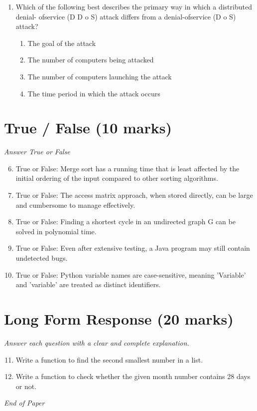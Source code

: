 \documentclass[12pt]{article}
\begin{document}
\begin{enumerate}[label=\arabic*.]
\begin{enumerate}[label=(\alph*)]
    \item To translate Web addresses to host names
    \item To determine the IP address of a given host name
    \item To determine the hardware address of a given host name
    \item To determine the hardware address of a given IP address
\end{enumerate}
\item Which of the following best describes the primary way in which a distributed denial- ofservice (D D o S) attack differs from a denial-ofservice (D o S) attack?
\begin{enumerate}[label=(\alph*)]
    \item The goal of the attack
    \item The number of computers being attacked
    \item The number of computers launching the attack
    \item The time period in which the attack occurs
\end{enumerate}
\end{enumerate}

\section*{True / False (10 marks)}
\textit{Answer True or False}
\begin{enumerate}[label=\arabic*.]
\setcounter{enumi}{5}
\item True or False: Merge sort has a running time that is least affected by the initial ordering of the input compared to other sorting algorithms.
\item True or False: The access matrix approach, when stored directly, can be large and cumbersome to manage effectively.
\item True or False: Finding a shortest cycle in an undirected graph G can be solved in polynomial time.
\item True or False: Even after extensive testing, a Java program may still contain undetected bugs.
\item True or False: Python variable names are case-sensitive, meaning 'Variable' and 'variable' are treated as distinct identifiers.
\end{enumerate}

\section*{Long Form Response (20 marks)}
\textit{Answer each question with a clear and complete explanation.}
\begin{enumerate}[label=\arabic*.]
\setcounter{enumi}{10}
\item Write a function to find the second smallest number in a list.
\item Write a function to check whether the given month number contains 28 days or not.
\end{enumerate}

\vfill
\noindent\textit{End of Paper}
\end{document}
